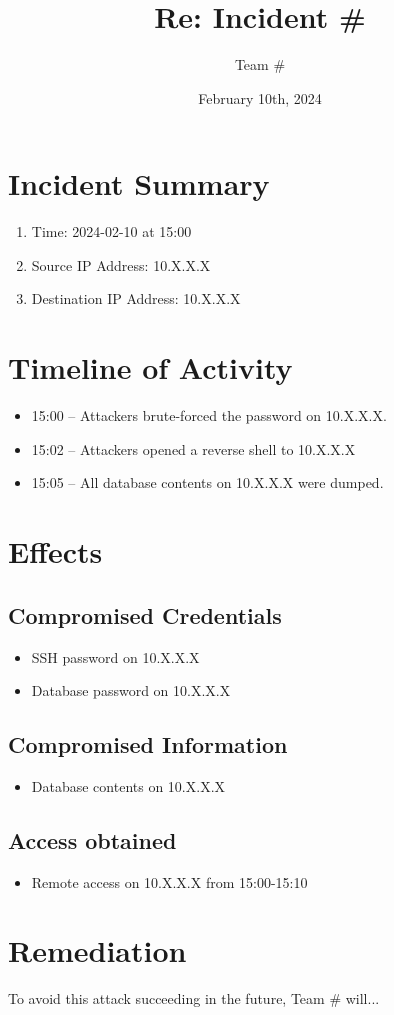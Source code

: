 \documentclass{article}
\begin{document}
\title{Re: Incident \#}
\author{Team \#}
\date{February 10th, 2024}
\maketitle

\section{Incident Summary}
\begin{enumerate}
	\item Time: 2024-02-10 at 15:00
	\item Source IP Address: 10.X.X.X
	\item Destination IP Address: 10.X.X.X
\end{enumerate}

\section{Timeline of Activity}
\begin{itemize}
	\item 15:00 -- Attackers brute-forced the password on 10.X.X.X.
	\item 15:02 -- Attackers opened a reverse shell to 10.X.X.X
	\item 15:05 -- All database contents on 10.X.X.X were dumped.
\end{itemize}

\section{Effects}
\subsection{Compromised Credentials}
\begin{itemize}
	\item SSH password on 10.X.X.X
	\item Database password on 10.X.X.X
\end{itemize}
\subsection{Compromised Information}
\begin{itemize}
	\item Database contents on 10.X.X.X
\end{itemize}
\subsection{Access obtained}
\begin{itemize}
	\item Remote access on 10.X.X.X from 15:00-15:10
\end{itemize}

\section{Remediation}
To avoid this attack succeeding in the future, Team \# will...
\end{document}
